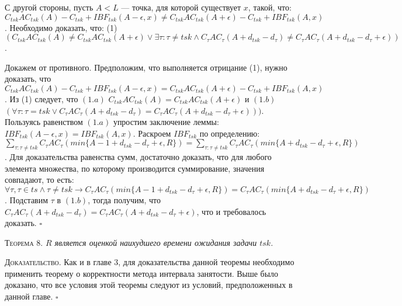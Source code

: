 \documentclass[14pt]{matmex-diploma-custom}
\begin{document}
  С другой стороны, пусть $A < L$ --- точка, для которой существует $x$, такой, что:
   $C_{tsk}AC_{tsk}(A) - C_{tsk} + IBF_{tsk}(A - \epsilon, x) \neq C_{tsk}AC_{tsk}(A + \epsilon) -  C_{tsk} + IBF_{tsk}(A,x)$.
  Необходимо доказать, что: 
    (1) $(C_{tsk}AC_{tsk}(A) \neq C_{tsk}AC_{tsk}(A + \epsilon) 
          \vee \exists \tau: \tau \neq tsk \wedge C_{\tau}AC_{\tau}(A + d_{tsk} - d_{\tau}) \neq 
                                                  C_{\tau}AC_{\tau}(A + d_{tsk} - d_{\tau} + \epsilon))$.
                                                  
  Докажем от противного. Предположим, что выполняется отрицание (1), 
    нужно доказать, что 
    $C_{tsk}AC_{tsk}(A) - C_{tsk} + IBF_{tsk}(A - \epsilon, x) = C_{tsk}AC_{tsk}(A + \epsilon) - C_{tsk} + IBF_{tsk}(A,x)$.
  Из (1) следует, что $(1.a)$ $C_{tsk}AC_{tsk}(A) = C_{tsk}AC_{tsk}(A + \epsilon)$ 
    и $(1.b)$ $(\forall \tau: \tau = tsk \vee C_{\tau}AC_{\tau}(A + d_{tsk} - d_{\tau}) 
              = C_{\tau}AC_{\tau}(A + d_{tsk} - d_{\tau} + \epsilon)))$.
  Пользуясь равенством $(1.a)$ упростим заключение леммы: $ IBF_{tsk}(A - \epsilon, x) = IBF_{tsk}(A,x)$.
  Раскроем $IBF_{tsk}$ по определению:
    $\sum_{\tau:\tau \neq tsk} C_{\tau}AC_{\tau}( min\{A - 1 + d_{tsk} - d_{\tau} + \epsilon, R\} ) = 
     \sum_{\tau:\tau \neq tsk} C_{\tau}AC_{\tau}( min\{A + d_{tsk} - d_{\tau} + \epsilon, R\} )$.
  Для доказательства равенства сумм, достаточно доказать, что для любого элемента множества, по 
    которому производится суммирование, значения совпадают, то есть: 
  $\forall \tau, \tau \in ts \wedge \tau \neq tsk \rightarrow 
     C_{\tau}AC_{\tau}( min\{A - 1 + d_{tsk} - d_{\tau} + \epsilon, R\}) = 
     C_{\tau}AC_{\tau}( min\{A + d_{tsk} - d_{\tau} + \epsilon, R\})$.
  Подставим $\tau$ в $(1.b)$, тогда получим, что 
    $C_{\tau}AC_{\tau}(A + d_{tsk} - d_{\tau}) = C_{\tau}AC_{\tau}(A + d_{tsk} - d_{\tau} + \epsilon)$,
    что и требовалось доказать. $\square$

\textsc{Теорема 8.}
\textit{$R$ является оценкой наихудшего времени ожидания задачи $tsk$. }

\textsc{Доказательство.} 
  Как и в главе 3, для доказательства данной теоремы необходимо применить теорему о корректности метода 
    интервала занятости. Выше было доказано, что все условия этой теоремы следуют
    из условий, предположенных в данной главе. 
$\square$

\end{document}
